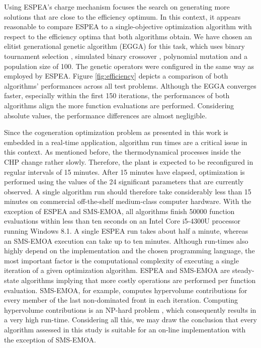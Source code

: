Using ESPEA's charge mechanism focuses the search on generating more solutions that are close to the efficiency optimum. In this context, it appears reasonable to compare ESPEA to a single-objective optimization algorithm with respect to the efficiency optima that both algorithms obtain. We have chosen an elitist generational genetic algorithm (EGGA) for this task, which uses binary tournament selection \cite{goldberg1991comparative}, simulated binary crossover \cite{sbx}, polynomial mutation \cite{polynomialmutation} and a population size of 100. The genetic operators were configured in the same way as employed by ESPEA. Figure \ref{fig:efficiency} depicts a comparison of both algorithms' performances across all test problems. Although the EGGA converges faster, especially within the first 150 iterations, the performances of both algorithms align the more function evaluations are performed. Considering absolute values, the performance differences are almost negligible.

Since the cogeneration optimization problem as presented in this work is embedded in a real-time application, algorithm run times are a critical issue in this context.
%
As mentioned before, the thermodynamical processes inside the CHP change rather slowly. Therefore, the plant is expected to be reconfigured in regular intervals of 15 minutes. After 15 minutes have elapsed, optimization is performed using the values of the 24 significant parameters that are currently observed.
%
A single algorithm run should therefore take considerably less than 15 minutes on commercial off-the-shelf medium-class computer hardware. With the exception of ESPEA and SMS-EMOA, all algorithms finish \num{50000} function evaluations within less than ten seconds on an Intel Core i5-4300U processor running Windows 8.1. A single ESPEA run takes about half a minute, whereas an SMS-EMOA execution can take up to ten minutes. Although run-times also highly depend on the implementation and the chosen programming language, the most important factor is the computational complexity of executing a single iteration of a given optimization algorithm. ESPEA and SMS-EMOA are steady-state algorithms implying that more costly operations are performed per function evaluation. SMS-EMOA, for example, computes hypervolume contributions for every member of the last non-dominated front in each iteration. Computing hypervolume contributions is an NP-hard problem \cite{hypervolumecontribution}, which consequently results in a very high run-time. Considering all this, we may draw the conclusion that every algorithm assessed in this study is suitable for an on-line implementation with the exception of SMS-EMOA.

